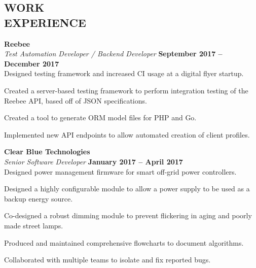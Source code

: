 \documentclass[margin,line]{resume}
\begin{document}
\begin{resume}
    \vspace{-1mm}

\sectionline

    \section{\mysidestyle \textbf{\large{W}\small{ORK}\\ \large{E}\small{XPERIENCE}}}

    \textbf{\listing Reebee} \vspace{2mm}\\\vspace{1mm}%
    \textsl{Test Automation Developer / Backend Developer} \hfill \textbf{September 2017 -- December 2017}\\
    Designed testing framework and increased CI usage at a digital flyer startup.\\
    \begin{tightemize}
    \item Created a server-based testing framework to perform integration testing of the Reebee API, based off of JSON specifications.
    \item Created a tool to generate ORM model files for PHP and Go.
    \item Implemented new API endpoints to allow automated creation of client profiles.
    \end{tightemize}

    \vspace{1mm}
    \textbf{\listing Clear Blue Technologies} \vspace{2mm}\\\vspace{1mm}%
    \textsl{Senior Software Developer} \hfill \textbf{January 2017 -- April 2017}\\
    Designed power management firmware for smart off-grid power controllers. \\
    \begin{tightemize}
    \item Designed a highly configurable module to allow a power supply to be used as a backup energy source.
    \item Co-designed a robust dimming module to prevent flickering in aging and poorly made street lamps.
    \item Produced and maintained comprehensive flowcharts to document algorithms.
    \item Collaborated with multiple teams to isolate and fix reported bugs.
    \end{tightemize}


\end{resume}
\end{document}
